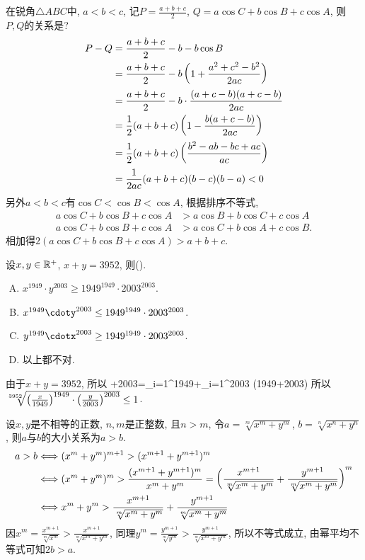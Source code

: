 \bq{}{}
在锐角$\triangle ABC$中, $a<b<c$, 记$P=\frac{a+b+c}{2}$, $Q=a\cos C+b\cos B+c\cos A$, 则$P,Q$的关系是?
\eq
\ba
\begin{align*}
 P-Q &= \frac{a+b+c}{2}-b-b\cos B\\
  &=\frac{a+b+c}{2}-b\left(1+\frac{a^2+c^2-b^2}{2ac}\right)\\
  &=\frac{a+b+c}{2}-b\cdot\frac{(a+c-b)(a+c-b)}{2ac}\\
  &=\frac12(a+b+c)\left(1-\frac{b(a+c-b)}{2ac}\right)\\
  &=\frac12(a+b+c)\left(\frac{b^2-ab-bc+ac}{ac}\right)\\
  &=\frac{1}{2ac}(a+b+c)(b-c)(b-a)<0
\end{align*}
另外$a<b<c$有$\cos C<\cos B<\cos A$, 根据排序不等式, 
\begin{align*}
a\cos C+b\cos B+c\cos A&>a\cos B+b\cos C+c\cos A\\
a\cos C+b\cos B+c\cos A&>a\cos C+b\cos A+c\cos B.
\end{align*}
相加得$2(a\cos C+b\cos B+c\cos A)>a+b+c$.
\ea

\bq{}{}
设$x,y\in\mathbb{R}^+$, $x+y=3952$, 则(\qquad).

\begin{enumerate}[A.]
 \item $x^{1949}\cdot y^{2003}\ge1949^{1949}\cdot2003^{2003}$.
 \item $x^{1949}\cdoty^{2003}\le1949^{1949}\cdot2003^{2003}$.
 \item $y^{1949}\cdotx^{2003}\ge1949^{1949}\cdot2003^{2003}$.
 \item 以上都不对.
\end{enumerate}
\eq
\ba
由于$x+y=3952$, 所以
+2003=\sum_{i=1}^{1949}+\sum_{i=1}^{2003}
  \ge(1949+2003)
\eee
所以$\sqrt[3952]{\left(\frac{x}{1949}\right)^{1949}\cdot\left(\frac{y}{2003}\right)^{2003}}\le1$.
\ea

\bq{}{}
设$x,y$是不相等的正数, $n,m$是正整数, 且$n>m$, 令$a=\sqrt[m]{x^m+y^m}$, $b=\sqrt[n]{x^n+y^n}$, 
则$a$与$b$的大小关系为\underline{$a>b$}.
\eq
\ba
\begin{align*}
 a>b&\Longleftrightarrow (x^m+y^m)^{m+1}>(x^{m+1}+y^{m+1})^m\\
  &\Longleftrightarrow (x^m+y^m)^m>\frac{(x^{m+1}+y^{m+1})^{m}}{x^m+y^m}=\left(\frac{x^{m+1}}{\sqrt[m]{x^m+y^m}}+\frac{y^{m+1}}{\sqrt[m]{x^m+y^m}}\right)^m\\
  &\Longleftrightarrow x^m+y^m>\frac{x^{m+1}}{\sqrt[m]{x^m+y^m}}+\frac{y^{m+1}}{\sqrt[m]{x^m+y^m}}
\end{align*}
因$x^m=\frac{x^{m+1}}{\sqrt[m]{x^m}}>\frac{x^{m+1}}{\sqrt[m]{x^m+y^m}}$, 
同理$y^m=\frac{y^{m+1}}{\sqrt[m]{y^m}}>\frac{y^{m+1}}{\sqrt[m]{x^m+y^m}}$,
所以不等式成立, 由幂平均不等式可知$2b>a$.
\ea

